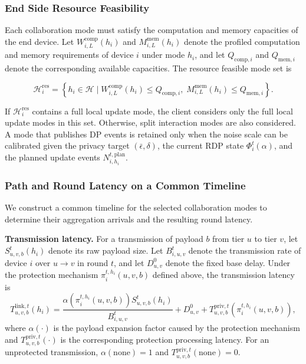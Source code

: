 \documentclass[5p,times]{elsarticle}
\theoremstyle{plain}
\theoremstyle{definition}
\theoremstyle{remark}
\begin{document}
\subsubsection{End Side Resource Feasibility}
\label{sec:end_resource}

Each collaboration mode must satisfy the computation and memory capacities
of the end device. Let \(W_{i,L}^{\mathrm{comp}}(h_i)\) and
\(M_{i,L}^{\mathrm{mem}}(h_i)\) denote the profiled computation and memory
requirements of device \(i\) under mode \(h_i\), and let
\(Q_{\mathrm{comp},i}\) and \(Q_{\mathrm{mem},i}\) denote the corresponding
available capacities. The resource feasible mode set is

\begin{equation}
\mathcal H_i^{\mathrm{res}}
=
\left\{
h_i\in\mathcal H
\mid
W_{i,L}^{\mathrm{comp}}(h_i)\le Q_{\mathrm{comp},i},
\;
M_{i,L}^{\mathrm{mem}}(h_i)\le Q_{\mathrm{mem},i}
\right\}.
\label{eq:resource_feasible}
\end{equation}

If \(\mathcal H_i^{\mathrm{res}}\) contains a full local update mode, the client considers only the full local update modes in this set. Otherwise, split interaction modes are also considered. A mode that publishes DP events is retained only when the noise scale can be calibrated given the privacy target \((\bar\epsilon,\delta)\), the current RDP state \(\Phi_i^t(\alpha)\), and the planned update events \(N_{i,h_i}^{t,\mathrm{plan}}\).
\subsubsection{Path and Round Latency on a Common Timeline}

We construct a common timeline for the selected collaboration modes to determine their aggregation arrivals and the resulting round latency.

\textbf{Transmission latency.}
For a transmission of payload \(b\) from tier \(u\) to tier \(v\), let \(S_{u,v,b}^t(h_i)\) denote its raw payload size. Let \(B_{i,u,v}^t\) denote the transmission rate of device \(i\) over \(u\!\to\!v\) in round \(t\), and let \(D_{u,v}^{0}\) denote the fixed base delay. Under the protection mechanism \(\pi_i^{t,h_i}(u,v,b)\) defined above, the transmission latency is
\begin{equation}
T_{u,v,b}^{\mathrm{link},t}(h_i)
=
\frac{
\alpha\!\left(\pi_i^{t,h_i}(u,v,b)\right)
S_{u,v,b}^t(h_i)}
{B_{i,u,v}^t}
+
D_{u,v}^{0}
+
T_{u,v,b}^{\mathrm{priv},t}
\!\left(\pi_i^{t,h_i}(u,v,b)\right),
\label{eq:comm_latency}
\end{equation}
where \(\alpha(\cdot)\) is the payload expansion factor caused by the protection mechanism and \(T_{u,v,b}^{\mathrm{priv},t}(\cdot)\) is the corresponding protection processing latency. For an unprotected transmission, \(\alpha(\mathrm{none})=1\) and \(T_{u,v,b}^{\mathrm{priv},t}(\mathrm{none})=0\).
\end{document}
